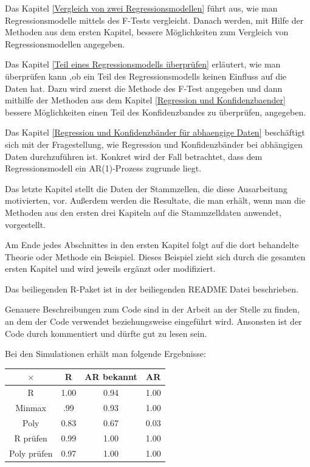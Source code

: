 \documentclass[12pt,a4paper]{article}
\theoremstyle{definition}
\theoremstyle{definition}
\theoremstyle{definition}
\theoremstyle{definition}
\newcommand{\UeberRR}{1.00}
\newcommand{\UeberRMinmax}{.99}
\newcommand{\UeberRMinmaxPoly}{0.83}
\newcommand{\UeberARbekanntR}{0.94}
\newcommand{\UeberARbekanntMinmax}{0.93}
\newcommand{\UeberARbekanntMinmaxPoly}{0.67}
\newcommand{\UeberARR}{1.00}
\newcommand{\UeberARMinmax}{1.00}
\newcommand{\UeberARMinmaxPoly}{0.03}
\newcommand{\UeberRRpruefen}{0.99}
\newcommand{\UeberRMinmaxPolyfastpruefen}{0.97}
\newcommand{\UeberARbekanntRpruefen}{1.00}
\newcommand{\UeberARbekanntMinmaxPolyfastpruefen}{1.00}
\newcommand{\UeberARRpruefen}{1.00}
\newcommand{\UeberARMinmaxPolyfastpruefen}{1.00}
\begin{document}
Das Kapitel \ref{Vergleich von zwei Regressionsmodellen} führt aus, wie man Regressionsmodelle mittels des F-Tests vergleicht. Danach werden, mit Hilfe der Methoden aus dem ersten Kapitel, bessere Möglichkeiten zum Vergleich von Regressionsmodellen angegeben.

Das Kapitel \ref{Teil eines Regressionsmodells überprüfen} erläutert, wie man überprüfen kann ,ob ein Teil des Regressionsmodells keinen Einfluss auf die Daten hat. Dazu wird zuerst die Methode des F-Test angegeben und dann mithilfe der Methoden aus dem Kapitel \ref{Regression und Konfidenzbaender} bessere Möglichkeiten einen Teil des Konfidenzbandes zu überprüfen, angegeben.

Das Kapitel \ref{Regression und Konfidenzbänder für abhaengige Daten} beschäftigt sich mit der Fragestellung, wie Regression und Konfidenzbänder bei abhängigen Daten durchzuführen ist. Konkret wird der Fall betrachtet, dass dem Regressionsmodell ein AR(1)-Prozess zugrunde liegt.

Das letzte Kapitel stellt die Daten der Stammzellen, die diese Ausarbeitung motivierten, vor. Außerdem werden die Resultate, die man erhält, wenn man die Methoden aus den ersten drei Kapiteln auf die Stammzelldaten anwendet, vorgestellt.

Am Ende jedes Abschnittes in den ersten Kapitel folgt auf die dort behandelte Theorie oder Methode ein Beispiel. Dieses Beispiel zieht sich durch die gesamten ersten Kapitel und wird jeweils ergänzt oder modifiziert.

Das beiliegenden R-Paket ist in der beiliegenden README Datei beschrieben.

Genauere Beschreibungen zum Code sind in der Arbeit an der Stelle zu finden, an dem der Code verwendet beziehungsweise eingeführt wird. Ansonsten ist der Code durch kommentiert und dürfte gut zu lesen sein.

Bei den Simulationen erhält man folgende Ergebnisse:

\begin{center}
\begin{tabular}{|c|c|c|c|}
\hline 
$\times$ & R & AR bekannt & AR \\ 
\hline 
R		 & \UeberRR		  & \UeberARbekanntR & \UeberARR \\ 
\hline 
Minmax	 & \UeberRMinmax  & \UeberARbekanntMinmax & \UeberARMinmax \\ 
\hline 
Poly  & \UeberRMinmaxPoly & \UeberARbekanntMinmaxPoly & \UeberARMinmaxPoly \\ 
\hline 
R prüfen    & \UeberRRpruefen & \UeberARbekanntRpruefen & \UeberARRpruefen \\ 
\hline 
Poly prüfen	& \UeberRMinmaxPolyfastpruefen & \UeberARbekanntMinmaxPolyfastpruefen & \UeberARMinmaxPolyfastpruefen \\ 
\hline 
\end{tabular} 
\end{center}
\end{document}
